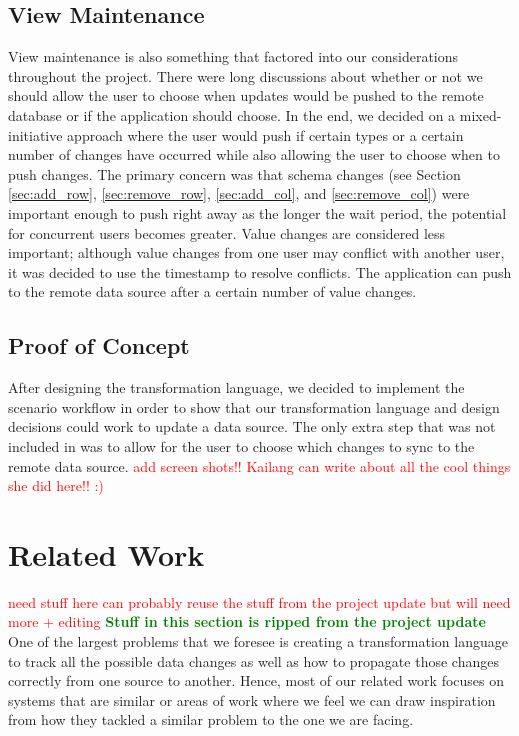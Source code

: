 \documentclass[12pt]{article}
\begin{document}
\subsection{View Maintenance}
View maintenance is also something that factored into our considerations throughout the project. There were long discussions about whether or not we should allow the user to choose when updates would be pushed to the remote database or if the application should choose. In the end, we decided on a mixed-initiative approach where the user would push if certain types or a certain number of changes have occurred while also allowing the user to choose when to push changes. The primary concern was that schema changes (see Section \ref{sec:add_row}, \ref{sec:remove_row}, \ref{sec:add_col}, and \ref{sec:remove_col}) were important enough to push right away as the longer the wait period, the potential for concurrent users becomes greater. Value changes are considered less important; although value changes from one user may conflict with another user, it was decided to use the timestamp to resolve conflicts. The application can push to the remote data source after a certain number of value changes.

\subsection{Proof of Concept}
After designing the transformation language, we decided to implement the scenario workflow in order to show that our transformation language and design decisions could work to update a data source. The only extra step that was not included in \cite{arniThesis} was to allow for the user to choose which changes to sync to the remote data source. \textcolor{red}{add screen shots!! Kailang can write about all the cool things she did here!! :)}

\section{Related Work}
\textcolor{red}{need stuff here can probably reuse the stuff from the project update but will need more + editing}
\textbf{\textcolor{green}{Stuff in this section is ripped from the project update}}
One of the largest problems that we foresee is creating a transformation language to track all the possible data changes as well as how to propagate those changes correctly from one source to another. Hence, most of our related work focuses on systems that are similar or areas of work where we feel we can draw inspiration from how they tackled a similar problem to the one we are facing.
\end{document}
